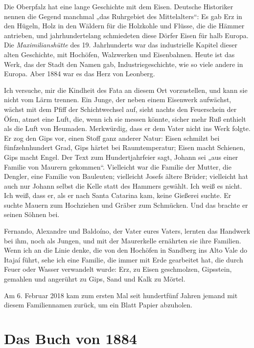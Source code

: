 \documentclass[
  ngerman,
  11pt,
  openany]{book}
\begin{document}
Die Oberpfalz hat eine lange Geschichte mit dem Eisen. Deutsche
Historiker nennen die Gegend manchmal „das Ruhrgebiet des
Mittelalters``: Es gab Erz in den Hügeln, Holz in den Wäldern für die
Holzkohle und Flüsse, die die Hämmer antrieben, und jahrhundertelang
schmiedeten diese Dörfer Eisen für halb Europa. Die
\emph{Maximilianshütte} des 19. Jahrhunderts war das industrielle
Kapitel dieser alten Geschichte, mit Hochöfen, Walzwerken und
Eisenbahnen. Heute ist das Werk, das der Stadt den Namen gab,
Industriegeschichte, wie so viele andere in Europa. Aber 1884 war es das
Herz von Leonberg.

Ich versuche, mir die Kindheit des Fata an diesem Ort vorzustellen, und
kann sie nicht vom Lärm trennen. Ein Junge, der neben einem Eisenwerk
aufwächst, wächst mit dem Pfiff der Schichtwechsel auf, sieht nachts den
Feuerschein der Öfen, atmet eine Luft, die, wenn ich sie messen könnte,
sicher mehr Ruß enthielt als die Luft von Heumaden. Merkwürdig, dass er
dem Vater nicht ins Werk folgte. Er zog den Gips vor, einen Stoff ganz
anderer Natur: Eisen schmilzt bei fünfzehnhundert Grad, Gips härtet bei
Raumtemperatur; Eisen macht Schienen, Gips macht Engel. Der Text zum
Hundertjahrfeier sagt, Johann sei „aus einer Familie von Maurern
gekommen``. Vielleicht war die Familie der Mutter, die Dengler, eine
Familie von Bauleuten; vielleicht Josefs ältere Brüder; vielleicht hat
auch nur Johann selbst die Kelle statt des Hammers gewählt. Ich weiß es
nicht. Ich weiß, dass er, als er nach Santa Catarina kam, keine Gießerei
suchte. Er suchte Mauern zum Hochziehen und Gräber zum Schmücken. Und
das brachte er seinen Söhnen bei.

Fernando, Alexandre und Baldoíno, der Vater eures Vaters, lernten das
Handwerk bei ihm, noch als Jungen, und mit der Maurerkelle ernährten sie
ihre Familien. Wenn ich an die Linie denke, die von den Hochöfen in
Sandberg ins Alto Vale do Itajaí führt, sehe ich eine Familie, die immer
mit Erde gearbeitet hat, die durch Feuer oder Wasser verwandelt wurde:
Erz, zu Eisen geschmolzen, Gipsstein, gemahlen und angerührt zu Gips,
Sand und Kalk zu Mörtel.

Am 6. Februar 2018 kam zum ersten Mal seit hundertfünf Jahren jemand mit
diesem Familiennamen zurück, um ein Blatt Papier abzuholen.

\section{Das Buch von 1884}\label{das-buch-von-1884}
\end{document}
